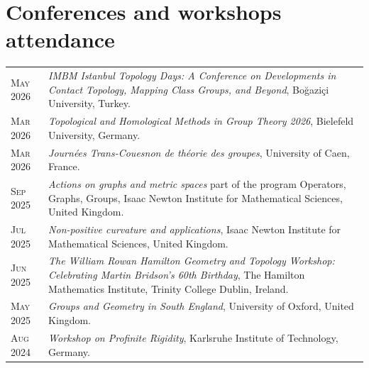 \documentclass[a4paper,10pt]{article} %
\begin{document}

\section{Conferences and workshops attendance}

\begin{longtable}{>{\raggedleft\arraybackslash}p{2cm}p{13cm}}

	\textsc{May 2026} & \emph{IMBM Istanbul Topology Days:
A Conference on Developments in Contact Topology, Mapping Class Groups, and Beyond}, Bo\u{g}azi\c{c}i University, Turkey. \\ %

	\textsc{Mar 2026} & \emph{Topological and Homological Methods in Group Theory 2026}, Bielefeld
    University, Germany. \\ %
    
	\textsc{Mar 2026} & \emph{Journées Trans-Couesnon de théorie des groupes}, University of Caen, France. \\ %

	\textsc{Sep 2025} &\emph{Actions on graphs and metric spaces} part of the program Operators, Graphs, Groups, Isaac Newton Institute for Mathematical Sciences, United Kingdom. \\ %

	\textsc{Jul 2025} &\emph{Non-positive curvature and applications}, Isaac Newton Institute for Mathematical Sciences, United Kingdom. \\ %
	
	\textsc{Jun 2025} & \emph{The William Rowan Hamilton Geometry and Topology Workshop: Celebrating Martin Bridson's 60th Birthday}, The Hamilton Mathematics Institute, Trinity College Dublin, Ireland. \\ %
	
	\textsc{May 2025} & \emph{Groups and Geometry in South England}, University of Oxford, United Kingdom. \\ %

    \textsc{Aug 2024} & \emph{Workshop on Profinite Rigidity}, Karlsruhe Institute of Technology, Germany. \\ %


\end{longtable}
\end{document}

